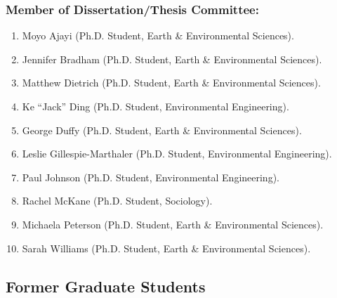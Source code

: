 \documentclass[10pt]{article}
\begin{document}
    \subsubsection{Member of Dissertation/Thesis Committee:}
    \begin{enumerate}
    \item Moyo Ajayi (Ph.D. Student, Earth \& Environmental Sciences).
    \item Jennifer Bradham (Ph.D. Student, Earth \& Environmental Sciences).
    \item Matthew Dietrich (Ph.D. Student, Earth \& Environmental Sciences).
    \item Ke ``Jack'' Ding (Ph.D. Student, Environmental Engineering).
    \item George Duffy (Ph.D. Student, Earth \& Environmental Sciences).
    \item Leslie Gillespie-Marthaler (Ph.D. Student, Environmental Engineering).
    \item Paul Johnson (Ph.D. Student, Environmental Engineering).
    \item Rachel McKane (Ph.D. Student, Sociology).
    \item Michaela Peterson (Ph.D. Student, Earth \& Environmental Sciences).
    \item Sarah Williams (Ph.D. Student, Earth \& Environmental Sciences).
    \end{enumerate}
    \subsection{Former Graduate Students}
\end{document}
